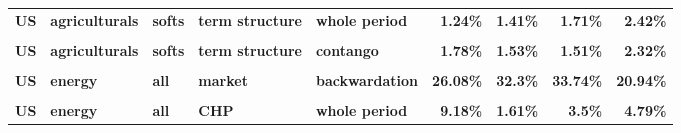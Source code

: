 \documentclass[
  authoryear,
  preprint,
  3p]{elsarticle}
\begin{document}
\begin{landscape}
\begin{longtable}[t]{>{}l>{}l>{}l>{}l>{}l>{}r>{}r>{}r>{}r}
\textbf{US} & \textbf{agriculturals} & \textbf{softs} & \textbf{term structure} & \textbf{whole period} & \textcolor[HTML]{4285f4}{\textbf{1.24\%}} & \textcolor[HTML]{4285f4}{\textbf{1.41\%}} & \textcolor[HTML]{4285f4}{\textbf{1.71\%}} & \textcolor[HTML]{4285f4}{\textbf{2.42\%}}\\
\addlinespace
\textbf{\cellcolor{gray!10}{US}} & \textbf{\cellcolor{gray!10}{agriculturals}} & \textbf{\cellcolor{gray!10}{softs}} & \textbf{\cellcolor{gray!10}{term structure}} & \textbf{\cellcolor{gray!10}{backwardation}} & \textcolor[HTML]{4285f4}{\textbf{\cellcolor{gray!10}{1.25\%}}} & \textcolor[HTML]{4285f4}{\textbf{\cellcolor{gray!10}{1.44\%}}} & \textcolor[HTML]{4285f4}{\textbf{\cellcolor{gray!10}{2.25\%}}} & \textcolor[HTML]{4285f4}{\textbf{\cellcolor{gray!10}{3.08\%}}}\\
\textbf{US} & \textbf{agriculturals} & \textbf{softs} & \textbf{term structure} & \textbf{contango} & \textcolor[HTML]{4285f4}{\textbf{1.78\%}} & \textcolor[HTML]{4285f4}{\textbf{1.53\%}} & \textcolor[HTML]{4285f4}{\textbf{1.51\%}} & \textcolor[HTML]{4285f4}{\textbf{2.32\%}}\\
\textbf{\cellcolor{gray!10}{US}} & \textbf{\cellcolor{gray!10}{energy}} & \textbf{\cellcolor{gray!10}{all}} & \textbf{\cellcolor{gray!10}{market}} & \textbf{\cellcolor{gray!10}{whole period}} & \textcolor[HTML]{4285f4}{\textbf{\cellcolor{gray!10}{26.58\%}}} & \textcolor[HTML]{4285f4}{\textbf{\cellcolor{gray!10}{31.57\%}}} & \textcolor[HTML]{4285f4}{\textbf{\cellcolor{gray!10}{38.94\%}}} & \textcolor[HTML]{4285f4}{\textbf{\cellcolor{gray!10}{25.9\%}}}\\
\textbf{US} & \textbf{energy} & \textbf{all} & \textbf{market} & \textbf{backwardation} & \textcolor[HTML]{4285f4}{\textbf{26.08\%}} & \textcolor[HTML]{4285f4}{\textbf{32.3\%}} & \textcolor[HTML]{4285f4}{\textbf{33.74\%}} & \textcolor[HTML]{4285f4}{\textbf{20.94\%}}\\
\textbf{\cellcolor{gray!10}{US}} & \textbf{\cellcolor{gray!10}{energy}} & \textbf{\cellcolor{gray!10}{all}} & \textbf{\cellcolor{gray!10}{market}} & \textbf{\cellcolor{gray!10}{contango}} & \textcolor[HTML]{4285f4}{\textbf{\cellcolor{gray!10}{26.84\%}}} & \textcolor[HTML]{4285f4}{\textbf{\cellcolor{gray!10}{31.47\%}}} & \textcolor[HTML]{4285f4}{\textbf{\cellcolor{gray!10}{42.16\%}}} & \textcolor[HTML]{4285f4}{\textbf{\cellcolor{gray!10}{28.77\%}}}\\
\addlinespace
\textbf{US} & \textbf{energy} & \textbf{all} & \textbf{CHP} & \textbf{whole period} & \textcolor[HTML]{4285f4}{\textbf{9.18\%}} & \textcolor[HTML]{4285f4}{\textbf{1.61\%}} & \textcolor[HTML]{4285f4}{\textbf{3.5\%}} & \textcolor[HTML]{4285f4}{\textbf{4.79\%}}\\

\end{longtable}
\end{landscape}
\end{document}
